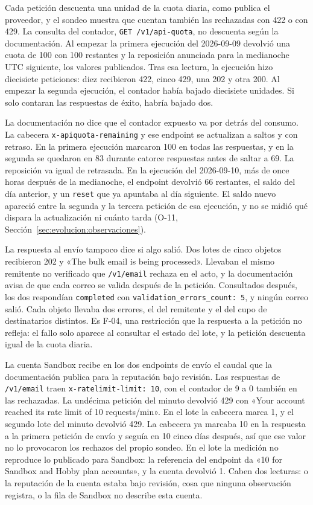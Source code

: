 Cada petición descuenta una unidad de la cuota diaria, como publica el proveedor, y el
sondeo muestra que cuentan también las rechazadas con 422 o con 429. La consulta del
contador, \texttt{GET /v1/api-quota}, no descuenta según la documentación. Al empezar
la primera ejecución del 2026-09-09 devolvió una cuota de 100 con 100 restantes y la
reposición anunciada para la medianoche UTC siguiente, los valores publicados. Tras
esa lectura, la ejecución hizo diecisiete peticiones: diez recibieron 422, cinco 429,
una 202 y otra 200. Al empezar la segunda ejecución, el contador había bajado
diecisiete unidades. Si solo contaran las respuestas de éxito, habría bajado dos.

La documentación no dice que el contador expuesto va por detrás del consumo. La
cabecera \texttt{x-apiquota-remaining} y ese endpoint se actualizan a saltos y con
retraso. En la primera ejecución marcaron 100 en todas las respuestas, y en la segunda
se quedaron en 83 durante catorce respuestas antes de saltar a 69. La reposición va
igual de retrasada. En la ejecución del 2026-09-10, más de once horas después de la
medianoche, el endpoint devolvió 66 restantes, el saldo del día anterior, y un
\texttt{reset} que ya apuntaba al día siguiente. El saldo nuevo apareció entre la
segunda y la tercera petición de esa ejecución, y no se midió qué dispara la
actualización ni cuánto tarda (O-11, Sección~\ref{sec:evolucion:observaciones}).

La respuesta al envío tampoco dice si algo salió. Dos lotes de cinco objetos
recibieron 202 y «The bulk email is being processed». Llevaban el mismo remitente no
verificado que \texttt{/v1/email} rechaza en el acto, y la documentación avisa de que
cada correo se valida después de la petición. Consultados después, los dos respondían
\texttt{completed} con \texttt{validation\_errors\_count: 5}, y ningún correo salió.
Cada objeto llevaba dos errores, el del remitente y el del cupo de destinatarios
distintos. Es F-04, una restricción que la respuesta a la petición no refleja: el
fallo solo aparece al consultar el estado del lote, y la petición descuenta igual de
la cuota diaria.

La cuenta Sandbox recibe en los dos endpoints de envío el caudal que la documentación
publica para la reputación bajo revisión. Las respuestas de \texttt{/v1/email} traen
\texttt{x-ratelimit-limit: 10}, con el contador de 9 a 0 también en las rechazadas. La
undécima petición del minuto devolvió 429 con «Your account reached its rate limit of
10 requests/min». En el lote la cabecera marca 1, y el segundo lote del minuto devolvió
429. La cabecera ya marcaba 10 en la respuesta a la primera petición de envío y seguía
en 10 cinco días después, así que ese valor no lo provocaron los rechazos del propio
sondeo. En el lote la medición no reproduce lo publicado para Sandbox: la referencia del endpoint da «10 for Sandbox and Hobby plan accounts», y la
cuenta devolvió 1. Caben dos lecturas: o la reputación de la cuenta estaba bajo
revisión, cosa que ninguna observación registra, o la fila de Sandbox no describe esta
cuenta.

